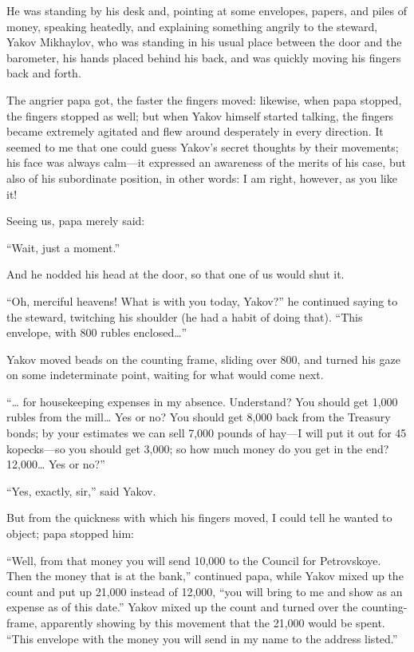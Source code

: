 He was standing by his desk and, pointing at some envelopes, papers, and piles of money, speaking heatedly, and explaining something angrily to the steward, Yakov Mikhaylov, who was standing in his usual place between the door and the barometer, his hands placed behind his back, and was quickly moving his fingers back and forth.

The angrier papa got, the faster the fingers moved: likewise, when papa stopped, the fingers stopped as well; but when Yakov himself started talking, the fingers became extremely agitated and flew around desperately in every direction. It seemed to me that one could guess Yakov's secret thoughts by their movements; his face was always calm---it expressed an awareness of the merits of his case, but also of his subordinate position, in other words: I am right, however, as you like it!

Seeing us, papa merely said:

``Wait, just a moment.'' %

And he nodded his head at the door, so that one of us would shut it.

``Oh, merciful heavens! What is with you today, Yakov?'' he continued saying to the steward, twitching his shoulder (he had a habit of doing that). ``This envelope, with 800 rubles enclosed\ldots{}'' %

Yakov moved beads on the counting frame, sliding over 800, and turned his gaze on some indeterminate point, waiting for what would come next.

``\ldots{} for housekeeping expenses in my absence. Understand? You should get 1,000 rubles from the mill\ldots{} Yes or no? You should get 8,000 back from the Treasury bonds; by your estimates we can sell 7,000 pounds of hay---I will put it out for 45 kopecks---so you should get 3,000; so how much money do you get in the end? 12,000\ldots{} Yes or no?'' %

``Yes, exactly, sir,'' said Yakov. %

But from the quickness with which his fingers moved, I could tell he wanted to object; papa stopped him:

``Well, from that money you will send 10,000 to the Council for Petrovskoye. Then the money that is at the bank,'' continued papa, while Yakov mixed up the count and put up 21,000 instead of 12,000, ``you will bring to me and show as an expense as of this date.'' Yakov mixed up the count and turned over the counting-frame, apparently showing by this movement that the 21,000 would be spent. ``This envelope with the money you will send in my name to the address listed.'' %

